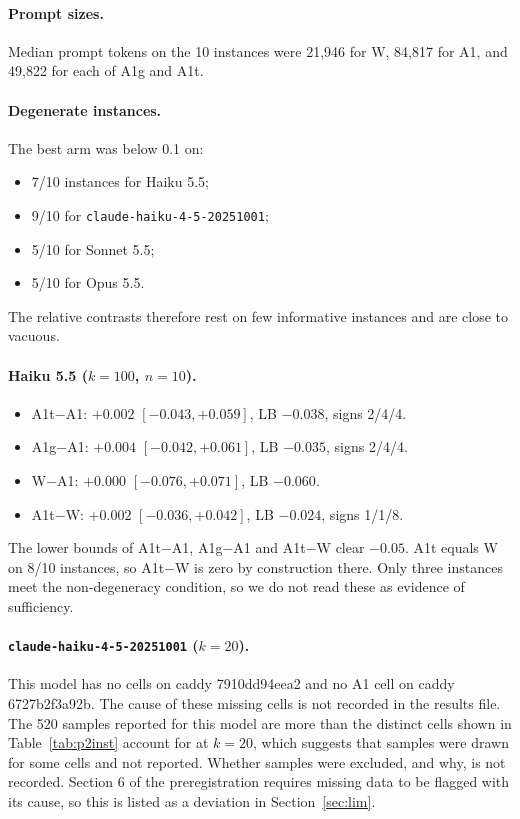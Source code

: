 \paragraph{Prompt sizes.} Median prompt tokens on the 10 instances were 21,946 for W, 84,817 for A1, and 49,822 for each of A1g and A1t.

\paragraph{Degenerate instances.} The best arm was below 0.1 on:
\begin{itemize}
\item 7/10 instances for Haiku 5.5;
\item 9/10 for \texttt{claude-haiku-4-5-20251001};
\item 5/10 for Sonnet 5.5;
\item 5/10 for Opus 5.5.
\end{itemize}
The relative contrasts therefore rest on few informative instances and are close to vacuous.

\paragraph{Haiku 5.5 ($k=100$, $n=10$).}
\begin{itemize}
\item A1t$-$A1: $+0.002$ $[-0.043, +0.059]$, LB $-0.038$, signs 2/4/4.
\item A1g$-$A1: $+0.004$ $[-0.042, +0.061]$, LB $-0.035$, signs 2/4/4.
\item W$-$A1: $+0.000$ $[-0.076, +0.071]$, LB $-0.060$.
\item A1t$-$W: $+0.002$ $[-0.036, +0.042]$, LB $-0.024$, signs 1/1/8.
\end{itemize}
The lower bounds of A1t$-$A1, A1g$-$A1 and A1t$-$W clear $-0.05$. A1t equals W on 8/10 instances, so A1t$-$W is zero by construction there. Only three instances meet the non-degeneracy condition, so we do not read these as evidence of sufficiency.

\paragraph{\texttt{claude-haiku-4-5-20251001} ($k=20$).} This model has no cells on caddy 7910dd94eea2 and no A1 cell on caddy 6727b2f3a92b. The cause of these missing cells is not recorded in the results file. The 520 samples reported for this model are more than the distinct cells shown in Table~\ref{tab:p2inst} account for at $k=20$, which suggests that samples were drawn for some cells and not reported. Whether samples were excluded, and why, is not recorded. Section 6 of the preregistration requires missing data to be flagged with its cause, so this is listed as a deviation in Section~\ref{sec:lim}.

